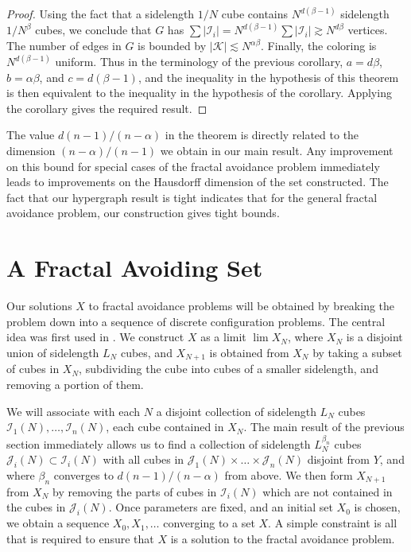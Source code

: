 \documentclass{article}
\theoremstyle{plain}
\theoremstyle{plain}
\begin{document}
\begin{multicols}{2}
\begin{proof}
	Using the fact that a sidelength $1/N$ cube contains $N^{d(\beta - 1)}$ sidelength $1/N^\beta$ cubes, we conclude that $G$ has $\sum |\mathcal{I}_i| = N^{d(\beta - 1)} \sum |\mathcal{I}_i| \gtrsim N^{d \beta}$ vertices. The number of edges in $G$ is bounded by $|\mathcal{K}| \lesssim N^{\alpha \beta}$. Finally, the coloring is $N^{d(\beta - 1)}$ uniform. Thus in the terminology of the previous corollary, $a = d \beta$, $b = \alpha \beta$, and $c = d(\beta - 1)$, and the inequality in the hypothesis of this theorem is then equivalent to the inequality in the hypothesis of the corollary. Applying the corollary gives the required result.
\end{proof}

The value $d(n-1)/(n-\alpha)$ in the theorem is directly related to the dimension $(n-\alpha)/(n-1)$ we obtain in our main result. Any improvement on this bound for special cases of the fractal avoidance problem immediately leads to improvements on the Hausdorff dimension of the set constructed. The fact that our hypergraph result is tight indicates that for the general fractal avoidance problem, our construction gives tight bounds.


\section{A Fractal Avoiding Set}

Our solutions $X$ to fractal avoidance problems will be obtained by breaking the problem down into a sequence of discrete configuration problems. The central idea was first used in \cite{MalabikaRob}. We construct $X$ as a limit $\lim X_N$, where $X_N$ is a disjoint union of sidelength $L_N$ cubes, and $X_{N+1}$ is obtained from $X_N$ by taking a subset of cubes in $X_N$, subdividing the cube into cubes of a smaller sidelength, and removing a portion of them.

We will associate with each $N$ a disjoint collection of sidelength $L_N$ cubes $\mathcal{I}_1(N), \dots, \mathcal{I}_n(N)$, each cube contained in $X_N$. The main result of the previous section immediately allows us to find a collection of sidelength $L_N^{\beta_n}$ cubes $\mathcal{J}_i(N) \subset \mathcal{I}_i(N)$ with all cubes in $\mathcal{J}_1(N) \times \dots \times \mathcal{J}_n(N)$ disjoint from $Y$, and where $\beta_n$ converges to $d(n-1)/(n-\alpha)$ from above. We then form $X_{N+1}$ from $X_N$ by removing the parts of cubes in $\mathcal{I}_i(N)$ which are not contained in the cubes in $\mathcal{J}_i(N)$. Once parameters are fixed, and an initial set $X_0$ is chosen, we obtain a sequence $X_0, X_1, \dots$ converging to a set $X$. A simple constraint is all that is required to ensure that $X$ is a solution to the fractal avoidance problem.


\end{multicols}
\end{document}
